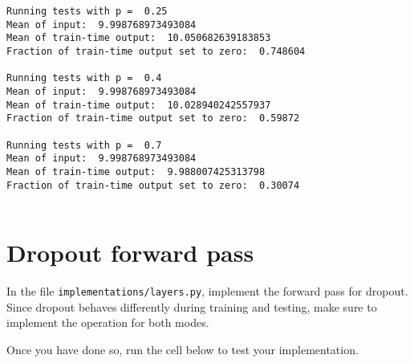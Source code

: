 \documentclass[11pt]{article}
\begin{document}
    \begin{Verbatim}[commandchars=\\\{\}]
Running tests with p =  0.25
Mean of input:  9.998768973493084
Mean of train-time output:  10.050682639183853
Fraction of train-time output set to zero:  0.748604

Running tests with p =  0.4
Mean of input:  9.998768973493084
Mean of train-time output:  10.028940242557937
Fraction of train-time output set to zero:  0.59872

Running tests with p =  0.7
Mean of input:  9.998768973493084
Mean of train-time output:  9.988007425313798
Fraction of train-time output set to zero:  0.30074


    \end{Verbatim}

    \hypertarget{dropout-forward-pass}{%
\section{Dropout forward pass}\label{dropout-forward-pass}}

In the file \texttt{implementations/layers.py}, implement the forward
pass for dropout. Since dropout behaves differently during training and
testing, make sure to implement the operation for both modes.

Once you have done so, run the cell below to test your implementation.
\end{document}
